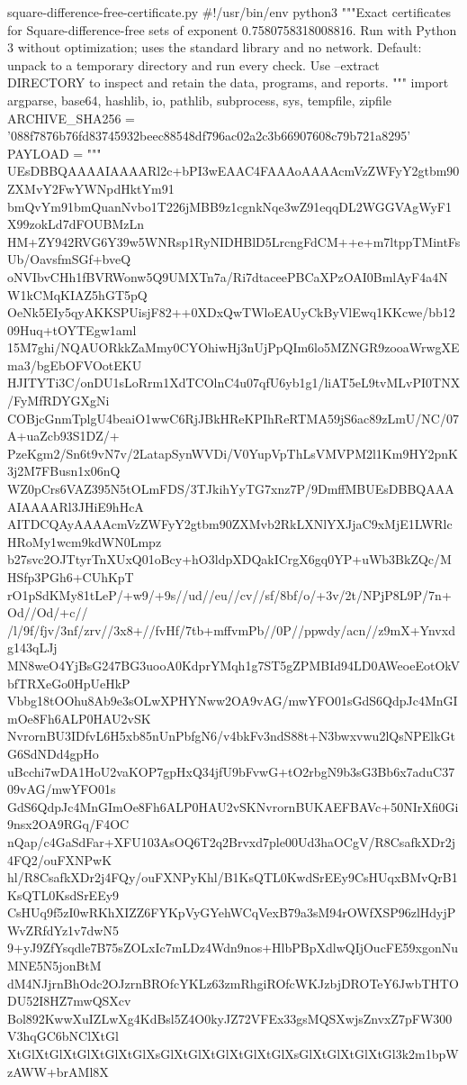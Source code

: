 \documentclass[11pt]{article}
\theoremstyle{definition}
\theoremstyle{remark}
\begin{document}
\begin{filecontents*}[overwrite]{square-difference-free-certificate.py}
#!/usr/bin/env python3
"""Exact certificates for Square-difference-free sets of exponent 0.7580758318008816.
Run with Python 3 without optimization; uses the standard library and no network.
Default: unpack to a temporary directory and run every check.
Use --extract DIRECTORY to inspect and retain the data, programs, and reports.
"""
import argparse, base64, hashlib, io, pathlib, subprocess, sys, tempfile, zipfile
ARCHIVE_SHA256 = '088f7876b76fd83745932beec88548df796ac02a2c3b66907608c79b721a8295'
PAYLOAD = """
UEsDBBQAAAAIAAAARl2c+bPI3wEAAC4FAAAoAAAAcmVzZWFyY2gtbm90ZXMvY2FwYWNpdHktYm91
bmQvYm91bmQuanNvbo1T226jMBB9z1cgnkNqe3wZ91eqqDL2WGGVAgWyF1X99zokLd7dFOUBMzLn
HM+ZY942RVG6Y39w5WNRsp1RyNIDHBlD5LrcngFdCM++e+m7ltppTMintFsUb/OavsfmSGf+bveQ
oNVIbvCHh1fBVRWonw5Q9UMXTn7a/Ri7dtaceePBCaXPzOAI0BmlAyF4a4NW1kCMqKIAZ5hGT5pQ
OeNk5EIy5qyAKKSPUisjF82++0XDxQwTWloEAUyCkByVlEwq1KKcwe/bb1209Huq+tOYTEgw1aml
15M7ghi/NQAUORkkZaMmy0CYOhiwHj3nUjPpQIm6lo5MZNGR9zooaWrwgXEma3/bgEbOFVOotEKU
HJITYTi3C/onDU1sLoRrm1XdTCOlnC4u07qfU6yb1g1/liAT5eL9tvMLvPI0TNX/FyMfRDYGXgNi
COBjcGnmTplgU4beaiO1wwC6RjJBkHReKPIhReRTMA59jS6ac89zLmU/NC/07A+uaZcb93S1DZ/+
PzeKgm2/Sn6t9vN7v/2LatapSynWVDi/V0YupVpThLsVMVPM2l1Km9HY2pnK3j2M7FBusn1x06nQ
WZ0pCrs6VAZ395N5tOLmFDS/3TJkihYyTG7xnz7P/9DmffMBUEsDBBQAAAAIAAAARl3JHiE9hHcA
AITDCQAyAAAAcmVzZWFyY2gtbm90ZXMvb2RkLXNlYXJjaC9xMjE1LWRlcHRoMy1wcm9kdWN0Lmpz
b27svc2OJTtyrTnXUxQ01oBcy+hO3ldpXDQakICrgX6gq0YP+uWb3BkZQc/MHSfp3PGh6+CUhKpT
rO1pSdKMy81tLeP/+w9/+9s//ud//eu//cv//sf/8bf/o/+3v/2t/NPjP8L9P/7n+Od//Od/+c//
/l/9f/fjv/3nf/zrv//3x8+//fvHf/7tb+mffvmPb//0P//ppwdy/acn//z9mX+Ynvxdg143qLJj
MN8weO4YjBsG247BG3uooA0KdprYMqh1g7ST5gZPMBId94LD0AWeoeEotOkVbfTRXeGo0HpUeHkP
Vbbg18tOOhu8Ab9e3sOLwXPHYNww2OA9vAG/mwYFO01sGdS6QdpJc4MnGImOe8Fh6ALP0HAU2vSK
NvrornBU3IDfvL6H5xb85nUnPbfgN6/v4bkFv3ndS88t+N3bwxvwu2lQsNPElkGtG6SdNDd4gpHo
uBcchi7wDA1HoU2vaKOP7gpHxQ34jfU9bFvwG+tO2rbgN9b3sG3Bb6x7aduC3709vAG/mwYFO01s
GdS6QdpJc4MnGImOe8Fh6ALP0HAU2vSKNvrornBUKAEFBAVc+50NIrXfi0Gi9nsx2OA9RGq/F4OC
nQap/c4GaSdFar+XFU103AsOQ6T2q2Brvxd7ple00Ud3haOCgV/R8CsafkXDr2j4FQ2/ouFXNPwK
hl/R8CsafkXDr2j4FQy/ouFXNPyKhl/B1KsQTL0KwdSrEEy9CsHUqxBMvQrB1KsQTL0KsdSrEEy9
CsHUq9f5zI0wRKhXIZZ6FYKpVyGYehWCqVexB79a3sM94rOWfXSP96zlHdyjPWvZRfdYz1v7dwN5
9+yJ9ZfYsqdle7B75sZOLxIc7mLDz4Wdn9nos+HlbPBpXdlwQIjOucFE59xgonNuMNE5N5jonBtM
dM4NJjrnBhOdc2OJzrnBROfcYKLz63zmRhgiROfcWKJzbjDROTeY6JwbTHTODU52I8HZ7mwQSXcv
Bol892KwwXuIZLwXg4KdBsl5Z4O0kyJZ72VFEx33gsMQSXwjsZnvxZ7pFW300V3hqGC6bNClXtGl
XtGlXtGlXtGlXtGlXtGlXsGlXtGlXtGlXtGlXtGlXsGlXtGlXtGlXtGl3k2m1bpWzAWW+brAMl8X

\end{filecontents*}
\end{document}
